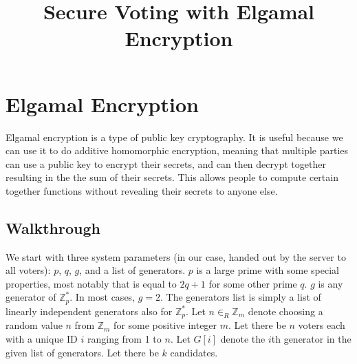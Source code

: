 \documentclass[11pt]{article}
\title{\textbf{Secure Voting with Elgamal Encryption}}
\date{}
\begin{document}
\maketitle

\section{Elgamal Encryption}

Elgamal encryption is a type of public key cryptography. It is useful because we can use it to do additive homomorphic encryption, meaning that multiple parties can use a public key to encrypt their secrets, and can then decrypt together resulting in the the sum of their secrets. This allows people to compute certain together functions without revealing their secrets to anyone else.

\subsection{Walkthrough}

We start with three system parameters (in our case, handed out by the server to all voters): $p$, $q$, $g$, and a list of generators. $p$ is a large prime with some special properties, most notably that is equal to $2q+1$ for some other prime $q$. $g$ is any generator of $\mathbb{Z}^{*}_{p}$. In most cases, $g=2$. The generators list is simply a list of linearly independent generators also for $\mathbb{Z}^{*}_{p}$. 
Let $n \in_{R} \mathbb{Z}_m$ denote choosing a random value $n$ from $\mathbb{Z}_m$ for some positive integer $m$. Let there be $n$ voters each with a unique ID $i$ ranging from 1 to $n$. Let $G[i]$ denote the $i$th generator in the given list of generators. Let there be $k$ candidates. 
\end{document}
